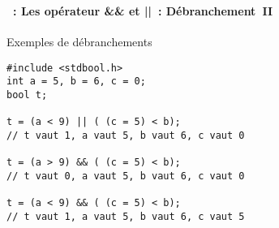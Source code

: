 \begin{frame}[containsverbatim]
  \frametitle{\secname}
  \framesubtitle{\subsecname~: Les opérateur \&\& et ||~: Débranchement~II} 

  \begin{exampleblock}{Exemples de débranchements}
    \begin{verbatim}
#include <stdbool.h>
int a = 5, b = 6, c = 0;
bool t;

t = (a < 9) || ( (c = 5) < b);
// t vaut 1, a vaut 5, b vaut 6, c vaut 0 
 
t = (a > 9) && ( (c = 5) < b);
// t vaut 0, a vaut 5, b vaut 6, c vaut 0

t = (a < 9) && ( (c = 5) < b);
// t vaut 1, a vaut 5, b vaut 6, c vaut 5\end{verbatim}
  \end{exampleblock}
\end{frame}

